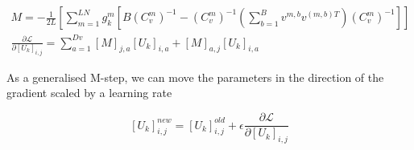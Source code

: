 \documentclass{paper}
\begin{document}
\begin{eqnarray}
M = -\frac{1}{2L} \left[ \sum_{m=1}^{LN} g_k^{m} \left[ B \left( C_v^m \right)^{-1} -  \left( C_v^m \right)^{-1} \left( \sum_{b=1}^B v^{m,b} v^{(m,b)T} \right) \left( C_v^m \right)^{-1} \right]\right] \\
\frac{\partial \mathcal{L}}{\partial \left[ U_k \right]_{i,j}} = \sum_{a=1}^{Dv} \left[ M \right]_{j,a} \left[ U_k \right]_{i,a} + \left[ M \right]_{a,j} \left[ U_k \right]_{i,a}
\end{eqnarray}

As a generalised M-step, we can move the parameters in the direction of the gradient scaled by a learning rate

\begin{equation}
\left[ U_k \right]_{i,j}^{new} = \left[ U_k \right]_{i,j}^{old} + \epsilon \frac{\partial \mathcal{L}}{\partial \left[ U_k \right]_{i,j}}
\end{equation}
\end{document}
